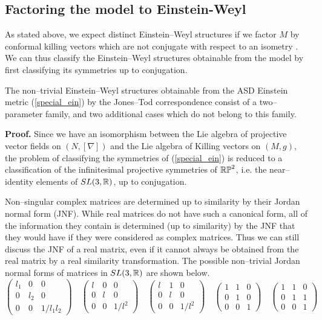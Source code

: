 \subsection{Factoring the model to Einstein-Weyl}
\label{neat2}
As stated above, we expect distinct Einstein--Weyl structures if we factor $M$ by conformal killing vectors which are not conjugate with respect to an isometry \cite{PT}. We can thus classify the Einstein--Weyl structures obtainable from the model by first classifying its symmetries up to conjugation.
\begin{prop}
The non--trivial Einstein--Weyl structures obtainable from the ASD Einstein metric (\ref{special_ein}) by the Jones--Tod correspondence consist of a two--parameter family, and two additional cases which do not belong to this family.
\end{prop}
\noindent
{\bf Proof. }Since we have an isomorphism between the Lie algebra of projective vector fields on $(N,[\nabla])$ and the Lie algebra of Killing vectors on $(M,g)$, the problem of classifying the symmetries of (\ref{special_ein}) is reduced to a classification of the infinitesimal  projective symmetries of $\mathbb{RP}^2$, i.e. the near--identity elements of $SL(3,\mathbb{R})$, up to conjugation.

Non--singular complex matrices are determined up to similarity by their Jordan normal form (JNF). While real matrices do not have such a canonical form, all of the information they contain is determined (up to similarity) by the JNF that they would have if they were considered as complex matrices. Thus we can still discuss the JNF of a real matrix, even if it cannot always be obtained from the real matrix by a real similarity transformation. The possible non--trivial Jordan normal forms of matrices in $SL(3,\mathbb{R})$ are shown below.
\[
\begin{pmatrix}l_1 & 0 & 0\\
0 & l_2 & 0\\
0 & 0 & 1/l_1l_2
\end{pmatrix}
\quad
\begin{pmatrix} l & 0 & 0\\
0 &  l & 0\\
0 & 0 & 1/ l^2
\end{pmatrix}
\quad
\begin{pmatrix} l & 1 & 0\\
0 &  l & 0\\
0 & 0 & 1/ l^2
\end{pmatrix}
\quad
\begin{pmatrix}1 & 1 & 0\\
0 & 1 & 0\\
0 & 0 & 1
\end{pmatrix}
\quad
\begin{pmatrix}1 & 1 & 0\\
0 & 1 & 1\\
0 & 0 & 1
\end{pmatrix}
\]

